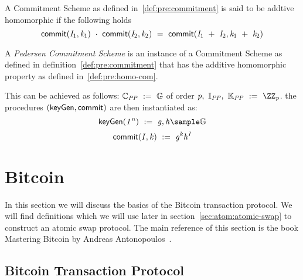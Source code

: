 \begin{definition}\label{def:pre:homo-com}
    A Commitment Scheme as defined in~\ref{def:pre:commitment} is said to be addtive homomorphic if the following holds~\cite{bunz2018bulletproofs}
    \[ \mathsf{commit}(\mathit{I}_1, \mathit{k}_1) ~\cdot~ \mathsf{commit}(\mathit{I}_2, \mathit{k}_2) ~=~ \mathsf{commit}(\mathit{I}_1 ~+~ \mathit{I}_2, \mathit{k}_1 ~+~ \mathit{k}_2) \]
\end{definition}

\begin{definition}\label{def:pre:pedersen}
    A \emph{Pedersen Commitment Scheme} is an instance of a Commitment Scheme as defined in definition~\ref{def:pre:commitment} that has the additive homomorphic property as defined in~\ref{def:pre:homo-com}.

This can be achieved as follows:
    $\mathbb{C}_{\mathit{PP}} ~:=~ \mathbb{G}$ of order $\varPrime \opSeperate \varInputSpace_{\varPublicParam} \opSeperate \varRandSpace_{\varPublicParam} \opAssign \cnstIntegersPrime{\varPrime}$.
    the procedures $(\mathsf{keyGen}, \mathsf{commit})$ are then instantiated as:
    \[ \procSetup{\varSecParam} \opAssign \varG, \varH \sample \cnstGroup\]
    \[ \mathsf{commit}(\mathit{I}, \mathit{k}) ~:=~ \mathit{g}^{\mathit{k}} \mathit{h}^{\mathit{I}} \]

\end{definition}


\section{Bitcoin} \label{sec:pre:bitcoin}

In this section we will discuss the basics of the Bitcoin transaction protocol.
We will find definitions which we will use later in section~\ref{sec:atom:atomic-swap} to construct an atomic swap protocol.
The main reference of this section is the book Mastering Bitcoin by Andreas Antonopoulos~\cite{antonopoulos2014mastering}.

\subsection{Bitcoin Transaction Protocol}\label{subsec:pre:bitcointx}

